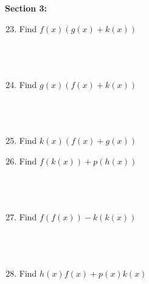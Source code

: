 \documentclass{article}
\begin{document}
\vspace{4cm}
\noindent
\textbf{Section 3:}
\\
\begin{minipage}[t]{0.45\textwidth}
    \begin{enumerate}
        \setcounter{enumi}{22}
        \item Find $f(x)(g(x)+k(x))$
        \\\\\\\\
        \item Find $g(x)(f(x)+k(x))$
        \\\\\\\\
        \item Find $k(x)(f(x)+g(x))$

    \end{enumerate}
\end{minipage}%
\hfill
\begin{minipage}[t]{0.45\textwidth}
    \begin{enumerate}
        \setcounter{enumi}{25} %
        \item Find $f(k(x)) + p(h(x))$
        \\\\\\\\
        \item Find $f(f(x)) - k(k(x))$
        \\\\\\\\
        \item Find $h(x)f(x) + p(x)k(x)$

    \end{enumerate}
\end{minipage}
\end{document}
